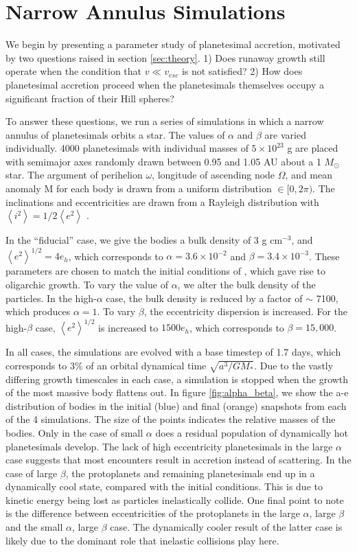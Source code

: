 \documentclass[twocolumn]{aastex63}
\begin{document}
\section{Narrow Annulus Simulations}\label{sec:narrow}

We begin by presenting a parameter study of planetesimal accretion,
motivated by two questions raised in section \ref{sec:theory}. 1) Does
runaway growth still operate when the condition that $v \ll v_{esc}$
is not satisfied? 2) How does planetesimal accretion proceed when the planetesimals themselves occupy a significant fraction of their Hill spheres?

To answer these questions, we run a series of simulations in which a
narrow annulus of planetesimals orbits a star. The values of $\alpha$
and $\beta$ are varied individually. 4000 planetesimals with
individual masses of $5 \times 10^{23}$ g are placed with semimajor
axes randomly drawn between 0.95 and 1.05 AU about a 1 $M_{\odot}$
star. The argument of perihelion $\omega$, longitude of ascending node
$\Omega$, and mean anomaly M for each body is drawn from a uniform
distribution $\in [0, 2 \pi)$. The inclinations and eccentricities are drawn
from a Rayleigh distribution with
$\left< i^{2} \right> = 1/2 \left< e^{2} \right>$ \citep{ida93a}.

In the ``fiducial'' case, we give the bodies a bulk density of 3 g
cm$^{-3}$, and $\left< e^{2} \right>^{1/2} = 4 e_{h}$, which corresponds to $\alpha = 3.6 \times 10^{-2}$ and $\beta = 3.4 \times 10^{-3}$. These parameters are chosen to match the initial conditions of \citet{kokubo98}, which gave rise to oligarchic growth. To vary the value of $\alpha$, we alter the bulk density of the particles. In the high-$\alpha$ case, the bulk density is reduced by a factor of $\sim$ 7100, which produces $\alpha = 1$. To vary $\beta$, the eccentricity dispersion is increased. For the high-$\beta$ case, $\left< e^{2} \right>^{1/2}$ is increased to $1500 e_{h}$, which corresponds to $\beta = 15,000$.

In all cases, the simulations are evolved with a base timestep of 1.7
days, which corresponds to 3\% of an orbital dynamical time
$\sqrt{a^3/G M_{*}}$. Due to the vastly differing growth timescales in
each case, a simulation is stopped when the growth of the most massive
body flattens out. In figure \ref{fig:alpha_beta}, we show the a-e
distribution of bodies in the initial (blue) and final (orange)
snapshots from each of the 4 simulations. The size of the points
indicates the relative masses of the bodies. Only in the case of small
$\alpha$ does a residual population of dynamically hot planetesimals
develop. The lack of high eccentricity planetesimals in the large
$\alpha$ case suggests that most encounters result in accretion
instead of scattering. In the case of large $\beta$, the protoplanets
and remaining planetesimals end up in a dynamically cool state,
compared with the initial conditions. This is due to kinetic energy 
being lost as particles inelastically collide. One final point to note 
is the difference between eccentricities of the protoplanets in the 
large $\alpha$, large $\beta$ and the small $\alpha$,
large $\beta$ case. The dynamically cooler result of the latter case
is likely due to the dominant role that inelastic collisions play here.
\end{document}
